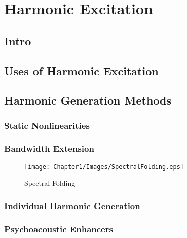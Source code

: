 \chapter{Harmonic Excitation}

\section{Intro}

\section{Uses of Harmonic Excitation}

\section{Harmonic Generation Methods}
	\subsection{Static Nonlinearities}

	\subsection{Bandwidth Extension}
		\begin{figure}[h!]
			\centering
			\texttt{[image: Chapter1/Images/SpectralFolding.eps]}
			\caption{Spectral Folding}
		\end{figure}

	\subsection{Individual Harmonic Generation}

	\subsection{Psychoacoustic Enhancers}

